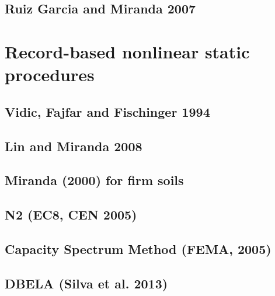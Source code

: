 		\subsection{Ruiz Garcia and Miranda 2007}
		\label{subsec:RuizGarciaMiranda}
		

	\section{Record-based nonlinear static procedures}
	\label{sec:record-nsp}
	

		\subsection{Vidic, Fajfar and Fischinger 1994}
		\label{subsec:VidicEtAl1994}
		

		\subsection{Lin and Miranda 2008}
		\label{subsec:LinMiranda2008}
		

		\subsection{Miranda (2000) for firm soils}
		\label{subsec:Miranda}
		

		\subsection{N2 (EC8, CEN 2005)}
		\label{subsec:N2}
		

		\subsection{Capacity Spectrum Method (FEMA, 2005)}
		\label{subsec:CSM}
		

		\subsection{DBELA (Silva et al. 2013)}
		\label{subsec:DBELA_Silva2013}
		


